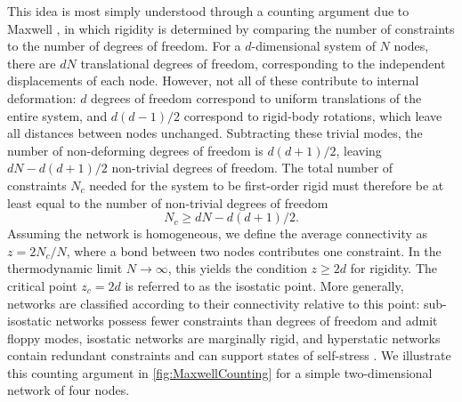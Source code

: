 This idea is most simply understood through a counting argument due to Maxwell \cite{maxwell_calculation_2011}, in which rigidity is determined by comparing the number of constraints to the number of degrees of freedom. For a $d$-dimensional system of $N$ nodes, there are $dN$ translational degrees of freedom, corresponding to the independent displacements of each node. However, not all of these contribute to internal deformation: $d$ degrees of freedom correspond to uniform translations of the entire system, and $d(d-1)/2$ correspond to rigid-body rotations, which leave all distances between nodes unchanged. Subtracting these trivial modes, the number of non-deforming degrees of freedom is $d(d+1)/2$, leaving $dN - d(d+1)/2$ non-trivial degrees of freedom. The total number of constraints $N_c$ needed for the system to be first-order rigid must therefore be at least equal to the number of non-trivial degrees of freedom
\[
    N_c \geq d N - d ( d+1 ) / 2.
\]
Assuming the network is homogeneous, we define the average connectivity as $z=2N_c/N$, where a bond between two nodes contributes one constraint. In the thermodynamic limit $N \to \infty$, this yields the condition $z \ge 2d$ for rigidity. The critical point $z_c = 2d$ is referred to as the isostatic point. More generally, networks are classified according to their connectivity relative to this point: sub-isostatic networks possess fewer constraints than degrees of freedom and admit floppy modes, isostatic networks are marginally rigid, and hyperstatic networks contain redundant constraints and can support states of self-stress \cite{LernerCoordination2024,Mao2018,ellenbroek_rigidity_2015,wyart_elasticity_2008}. We illustrate this counting argument in \cref{fig:MaxwellCounting} for a simple two-dimensional network of four nodes.


